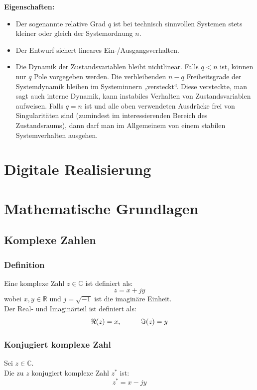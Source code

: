 \documentclass[10pt,a4paper]{article}
\newcommand{\tab}[1][1]{\hspace*{#1cm}}
\begin{document}
\textbf{Eigenschaften:}
\begin{itemize}
	\item Der sogenannte relative Grad $q$ ist bei technisch sinnvollen Systemen stets kleiner oder gleich der Systemordnung $n$.
	\item Der Entwurf sichert lineares Ein-/Ausgangsverhalten.
	\item Die Dynamik der Zustandsvariablen bleibt nichtlinear.	Falls $q < n$ ist, können nur $q$ Pole vorgegeben werden. Die verbleibenden $n − q$ Freiheitsgrade der Systemdynamik bleiben im Systeminnern „versteckt“. Diese versteckte, man sagt auch interne Dynamik, kann instabiles Verhalten von Zustandsvariablen aufweisen. Falls $q = n$ ist und alle oben verwendeten Ausdrücke frei von Singularitäten sind (zumindest im interessierenden Bereich des Zustandsraums), dann darf man im Allgemeinem von einem stabilen Systemverhalten ausgehen.
\end{itemize}

\section{Digitale Realisierung}














\appendix

\pagebreak
\section{Mathematische Grundlagen}
\subsection{Komplexe Zahlen}
\subsubsection{Definition}
Eine komplexe Zahl $z \in \mathbb{C}$ ist definiert als:
$$
	z = x + jy
$$
wobei $x, y \in \mathbb{R}$ und
$j = \sqrt{-1}$ ist die imaginäre Einheit. \\

Der Real- und Imaginärteil ist definiert als:
$$
	\Re(z) = x, \tab 	\Im(z) = y
$$

\subsubsection{Konjugiert komplexe Zahl}
Sei $z \in \mathbb{C}$. \\
Die zu $z$ konjugiert komplexe Zahl $z^*$ ist:
$$
	z^* = x - jy
$$
\end{document}

